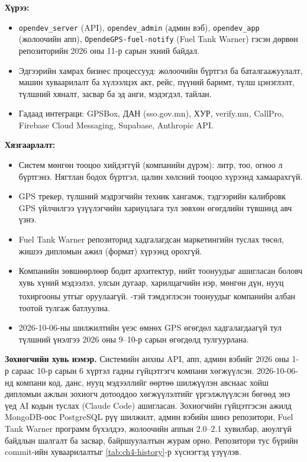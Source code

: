 \documentclass[
12pt,
oneside,
english,
onehalfspacing,
nolistspacing,
headsepline,
]{MUST-Thesis}
\newcommand{\batlah}[1]{#1\textsuperscript{\dag}}
\begin{document}
\textbf{Хүрээ:}
\begin{itemize}
    \item \texttt{opendev\_server} (API), \texttt{opendev\_admin} (админ вэб), \texttt{opendev\_app} (жолоочийн апп), \texttt{OpendeGPS-fuel-notify} (Fuel Tank Warner) гэсэн дөрвөн репозиторийн 2026 оны 11-р сарын эхний байдал.
    \item Эдгээрийн хамрах бизнес процессууд: жолоочийн бүртгэл ба баталгаажуулалт, машин хуваарилалт ба хүлээлцэх акт, рейс, пүүний баримт, түлш цэнэглэлт, түлшний хяналт, засвар ба эд анги, мэдэгдэл, тайлан.
    \item Гадаад интеграци: GPSBox, ДАН (sso.gov.mn), ХУР, verify.mn, CallPro, Firebase Cloud Messaging, Supabase, Anthropic API.
\end{itemize}

\textbf{Хязгаарлалт:}
\begin{itemize}
    \item Систем мөнгөн тооцоо хийдэггүй (компанийн дүрэм): литр, тоо, огноо л бүртгэнэ. Нягтлан бодох бүртгэл, цалин хөлсний тооцоо хүрээнд хамаарахгүй.
    \item GPS трекер, түлшний мэдрэгчийн техник хангамж, тэдгээрийн калибровк GPS үйлчилгээ үзүүлэгчийн хариуцлага тул зөвхөн өгөгдлийн түвшинд авч үзнэ.
    \item Fuel Tank Warner репозиторид хадгалагдсан маркетингийн туслах төсөл, жишээ дипломын ажил (формат) хүрээнд орохгүй.
    \item Компанийн зөвшөөрлөөр бодит архитектур, нийт тоонуудыг ашигласан боловч хувь хүний мэдээлэл, улсын дугаар, харилцагчийн нэр, мөнгөн дүн, нууц тохиргооны утгыг оруулаагүй. \batlah{}-тэй тэмдэглэсэн тоонуудыг компанийн албан тоотой тулгаж батлуулна.
    \item 2026-10-06-ны шилжилтийн үеэс өмнөх GPS өгөгдөл хадгалагдаагүй тул түлшний үнэлгээ 2026 оны 9--10-р сарын өгөгдөлд тулгуурлана.
\end{itemize}

\textbf{Зохиогчийн хувь нэмэр.} Системийн анхны API, апп, админ вэбийг 2026 оны 1-р сараас 10-р сарын 6 хүртэл гадны гүйцэтгэгч компани хөгжүүлсэн. 2026-10-06-нд компани код, данс, нууц мэдээллийг өөртөө шилжүүлэн авснаас хойш дипломын ажлын зохиогч дотооддоо хөгжүүлэлтийг үргэлжлүүлсэн бөгөөд энэ үед AI кодын туслах (Claude Code) ашигласан. Зохиогчийн гүйцэтгэсэн ажилд MongoDB-оос PostgreSQL рүү шилжилт, админ вэбийн шинэ репозитори, Fuel Tank Warner программ бүхэлдээ, жолоочийн аппын 2.0--2.1 хувилбар, аюулгүй байдлын шалгалт ба засвар, байршуулалтын журам орно. Репозитори тус бүрийн commit-ийн хуваарилалтыг \ref{tab:ch4-history}-р хүснэгтэд үзүүлэв.
\end{document}
